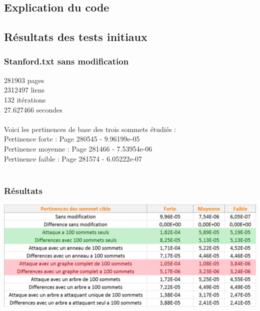 \documentclass[a4paper,11pt]{article}
\begin{document}
	\subsection{Explication du code}
	\subsection{Résultats des tests initiaux}
		\subsubsection{Stanford.txt sans modification}
			281903 pages\\
			2312497 liens\\
			132 itérations\\
			27.627466 secondes\\
			\\
			Voici les pertinences de base des trois sommets étudiés :\\
			Pertinence forte : Page 280545 - 9.96199e-05\\
			Pertinence moyenne : Page 281466 - 7.53954e-06\\
			Pertinence faible : Page 281574 - 6.05222e-07\\
			\\
		\subsubsection{Résultats}
			\includegraphics[scale = 0.5]{Captures/ranking1.PNG}
\end{document}
